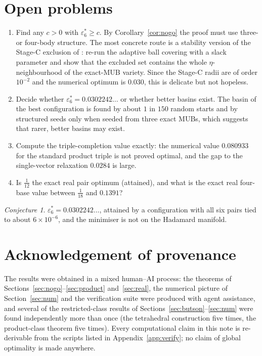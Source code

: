 \documentclass[11pt,a4paper]{article}
\theoremstyle{remark}
\newtheorem{conjecture}[theorem]{Conjecture}
\newcommand{\eps}{\varepsilon}
\begin{document}
\section{Open problems}
\label{sec:open}

\begin{enumerate}[label=(O\arabic*)]
\item Find any $c>0$ with $\eps_6^*\ge c$.  By Corollary~\ref{cor:nogo} the proof must use
three- or four-body structure.  The most concrete route is a stability version of the Stage-C
exclusion of \cite{preprint}: re-run the adaptive ball covering with a slack parameter and show
that the excluded set contains the whole $\eta$-neighbourhood of the exact-MUB variety.  Since
the Stage-C radii are of order $10^{-2}$ and the numerical optimum is $0.030$, this is
delicate but not hopeless.
\item Decide whether $\eps_6^*=0.0302242\ldots$ or whether better basins exist.  The basin of
the best configuration is found by about $1$ in $150$ random starts and by structured seeds
only when seeded from three exact MUBs, which suggests that rarer, better basins may exist.
\item Compute the triple-completion value exactly: the numerical value $0.080933$ for the
standard product triple is not proved optimal, and the gap to the single-vector relaxation
$0.0284$ is large.
\item Is $\tfrac1{12}$ the exact real pair optimum (attained), and what is the exact real
four-base value between $\tfrac1{18}$ and $0.1391$?
\end{enumerate}

\begin{conjecture}
$\eps_6^*=0.0302242\ldots$, attained by a configuration with all six pairs tied to about
$6\times10^{-6}$, and the minimiser is not on the Hadamard manifold.
\end{conjecture}

\section*{Acknowledgement of provenance}
The results were obtained in a mixed human--AI process: the theorems of
Sections~\ref{sec:nogo}--\ref{sec:product} and~\ref{sec:real}, the numerical picture of
Section~\ref{sec:num} and the verification suite were produced with agent assistance, and
several of the restricted-class results of Sections~\ref{sec:butson}--\ref{sec:num} were found
independently more than once (the tetrahedral construction five times, the product-class
theorem five times).  Every computational claim in this note is re-derivable from the scripts
listed in Appendix~\ref{app:verify}; no claim of global optimality is made anywhere.
\end{document}
